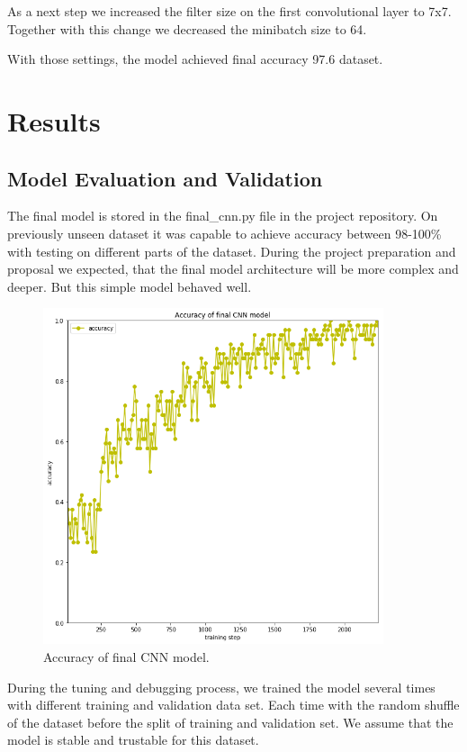 \documentclass{article}
\begin{document}
As a next step we increased the filter size on the first convolutional layer to
7x7. Together with this change we decreased the minibatch size to 64.

With those settings, the model achieved final accuracy 97.6%
dataset.

\section{Results}\label{results}

\subsection{Model Evaluation and
Validation}\label{model-evaluation-and-validation}

The final model is stored in the final\_cnn.py file in the project
repository. On previously unseen dataset it was capable to achieve
accuracy between 98-100\% with testing on different parts of the
dataset. During the project preparation and proposal we expected, that
the final model architecture will be more complex and deeper. But this
simple model behaved well.

\begin{figure}[!htp]
\centerline{\includegraphics[width=10cm]{img/final_model_accuracy.png}}
\renewcommand{\figurename}{Figure}
\caption[Accuracy of final CNN model.]{Accuracy of final CNN model.}
\label{fig:FinalModelAccuracy}
\end{figure}


During the tuning and debugging process, we trained the model several
times with different training and validation data set. Each time with
the random shuffle of the dataset before the split of training and
validation set. We assume that the model is stable and trustable for
this dataset.
\end{document}
